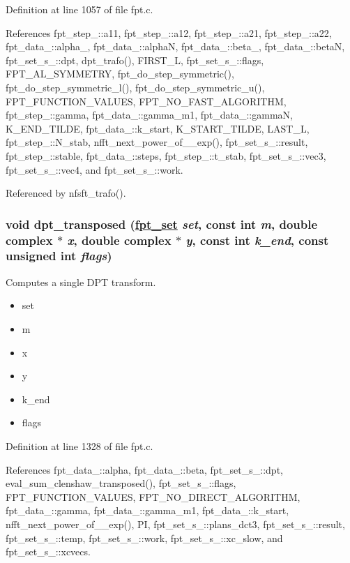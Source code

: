 Definition at line 1057 of file fpt.c.

References fpt\_\-step\_\-::a11, fpt\_\-step\_\-::a12, fpt\_\-step\_\-::a21, fpt\_\-step\_\-::a22, fpt\_\-data\_\-::alpha\_, fpt\_\-data\_\-::alpha\-N, fpt\_\-data\_\-::beta\_, fpt\_\-data\_\-::beta\-N, fpt\_\-set\_\-s\_\-::dpt, dpt\_\-trafo(), FIRST\_\-L, fpt\_\-set\_\-s\_\-::flags, FPT\_\-AL\_\-SYMMETRY, fpt\_\-do\_\-step\_\-symmetric(), fpt\_\-do\_\-step\_\-symmetric\_\-l(), fpt\_\-do\_\-step\_\-symmetric\_\-u(), FPT\_\-FUNCTION\_\-VALUES, FPT\_\-NO\_\-FAST\_\-ALGORITHM, fpt\_\-step\_\-::gamma, fpt\_\-data\_\-::gamma\_\-m1, fpt\_\-data\_\-::gamma\-N, K\_\-END\_\-TILDE, fpt\_\-data\_\-::k\_\-start, K\_\-START\_\-TILDE, LAST\_\-L, fpt\_\-step\_\-::N\_\-stab, nfft\_\-next\_\-power\_\-of\_\_\-exp(), fpt\_\-set\_\-s\_\-::result, fpt\_\-step\_\-::stable, fpt\_\-data\_\-::steps, fpt\_\-step\_\-::t\_\-stab, fpt\_\-set\_\-s\_\-::vec3, fpt\_\-set\_\-s\_\-::vec4, and fpt\_\-set\_\-s\_\-::work.

Referenced by nfsft\_\-trafo().\hypertarget{group__fpt_ga5}{
\subsubsection[dpt\_\-transposed]{\setlength{\rightskip}{0pt plus 5cm}void dpt\_\-transposed (\hyperlink{structfpt__set__s__}{fpt\_\-set} {\em set}, const int {\em m}, double complex $\ast$ {\em x}, double complex $\ast$ {\em y}, const int {\em k\_\-end}, const unsigned int {\em flags})}}
\label{group__fpt_ga5}


Computes a single DPT transform. 

\begin{itemize}
\item set \item m \item x \item y \item k\_\-end \item flags \end{itemize}


Definition at line 1328 of file fpt.c.

References fpt\_\-data\_\-::alpha, fpt\_\-data\_\-::beta, fpt\_\-set\_\-s\_\-::dpt, eval\_\-sum\_\-clenshaw\_\-transposed(), fpt\_\-set\_\-s\_\-::flags, FPT\_\-FUNCTION\_\-VALUES, FPT\_\-NO\_\-DIRECT\_\-ALGORITHM, fpt\_\-data\_\-::gamma, fpt\_\-data\_\-::gamma\_\-m1, fpt\_\-data\_\-::k\_\-start, nfft\_\-next\_\-power\_\-of\_\_\-exp(), PI, fpt\_\-set\_\-s\_\-::plans\_\-dct3, fpt\_\-set\_\-s\_\-::result, fpt\_\-set\_\-s\_\-::temp, fpt\_\-set\_\-s\_\-::work, fpt\_\-set\_\-s\_\-::xc\_\-slow, and fpt\_\-set\_\-s\_\-::xcvecs.

